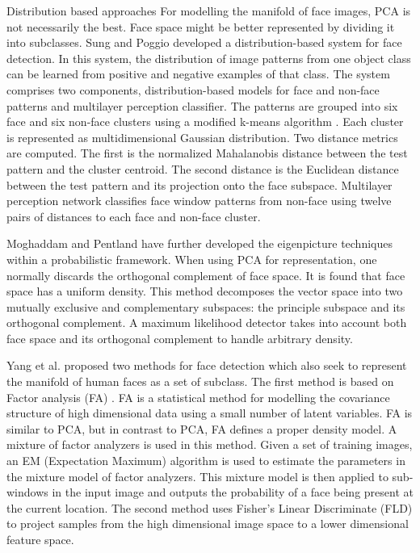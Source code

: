 Distribution based approaches
For modelling the manifold of face images, PCA is not necessarily the best. Face space might be better represented by dividing it into subclasses. Sung and Poggio \cite{} developed a distribution-based system for face detection. In this system, the distribution of image patterns from one object class can be learned from positive and negative examples of that class. The system comprises two components, distribution-based models for face and non-face patterns and multilayer perception classifier. The patterns are grouped into six face and six non-face clusters using a modified k-means algorithm \cite{}. Each cluster is represented as multidimensional Gaussian distribution. Two distance metrics are computed. The first is the normalized Mahalanobis distance \cite{} between the test pattern and the cluster centroid. The second distance is the Euclidean distance \cite{} between the test pattern and its projection onto the face subspace. Multilayer perception network classifies face window patterns from non-face using twelve pairs of distances to each face and non-face cluster. 

Moghaddam and Pentland \cite{} have further developed the eigenpicture techniques within a probabilistic framework. When using PCA for representation, one normally discards the orthogonal complement of face space. It is found that face space has a uniform density. This method decomposes the vector space into two mutually exclusive and complementary subspaces: the principle subspace and its orthogonal complement. A maximum likelihood detector takes into account both face space and its orthogonal complement to handle arbitrary density.

Yang et al. \cite{} proposed two methods for face detection which also seek to represent the manifold of human faces as a set of subclass. The first method is based on Factor analysis (FA) \cite{}. FA is a statistical method for modelling the covariance structure of high dimensional data using a small number of latent variables. FA is similar to PCA, but in contrast to PCA, FA defines a proper density model. A mixture of factor analyzers is used in this method. Given a set of training images, an EM (Expectation Maximum) algorithm \cite{} is used to estimate the parameters in the mixture model of factor analyzers. This mixture model is then applied to sub-windows in the input image and outputs the probability of a face being present at the current location. The second method uses Fisher’s Linear Discriminate (FLD) \cite{} to project samples from the high dimensional image space to a lower dimensional feature space. 

